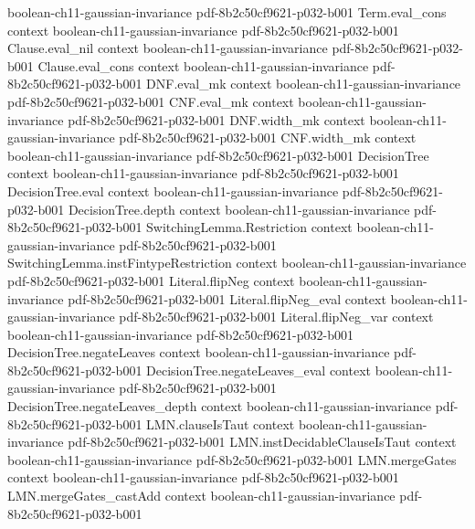 \begin{theorem}
  {boolean-ch11-gaussian-invariance}
  {pdf-8b2c50cf9621-p032-b001}
\proofstep
  {Term.eval_cons}
  {context}
  {boolean-ch11-gaussian-invariance}
  {pdf-8b2c50cf9621-p032-b001}
\proofstep
  {Clause.eval_nil}
  {context}
  {boolean-ch11-gaussian-invariance}
  {pdf-8b2c50cf9621-p032-b001}
\proofstep
  {Clause.eval_cons}
  {context}
  {boolean-ch11-gaussian-invariance}
  {pdf-8b2c50cf9621-p032-b001}
\proofstep
  {DNF.eval_mk}
  {context}
  {boolean-ch11-gaussian-invariance}
  {pdf-8b2c50cf9621-p032-b001}
\proofstep
  {CNF.eval_mk}
  {context}
  {boolean-ch11-gaussian-invariance}
  {pdf-8b2c50cf9621-p032-b001}
\proofstep
  {DNF.width_mk}
  {context}
  {boolean-ch11-gaussian-invariance}
  {pdf-8b2c50cf9621-p032-b001}
\proofstep
  {CNF.width_mk}
  {context}
  {boolean-ch11-gaussian-invariance}
  {pdf-8b2c50cf9621-p032-b001}
\proofstep
  {DecisionTree}
  {context}
  {boolean-ch11-gaussian-invariance}
  {pdf-8b2c50cf9621-p032-b001}
\proofstep
  {DecisionTree.eval}
  {context}
  {boolean-ch11-gaussian-invariance}
  {pdf-8b2c50cf9621-p032-b001}
\proofstep
  {DecisionTree.depth}
  {context}
  {boolean-ch11-gaussian-invariance}
  {pdf-8b2c50cf9621-p032-b001}
\proofstep
  {SwitchingLemma.Restriction}
  {context}
  {boolean-ch11-gaussian-invariance}
  {pdf-8b2c50cf9621-p032-b001}
\proofstep
  {SwitchingLemma.instFintypeRestriction}
  {context}
  {boolean-ch11-gaussian-invariance}
  {pdf-8b2c50cf9621-p032-b001}
\proofstep
  {Literal.flipNeg}
  {context}
  {boolean-ch11-gaussian-invariance}
  {pdf-8b2c50cf9621-p032-b001}
\proofstep
  {Literal.flipNeg_eval}
  {context}
  {boolean-ch11-gaussian-invariance}
  {pdf-8b2c50cf9621-p032-b001}
\proofstep
  {Literal.flipNeg_var}
  {context}
  {boolean-ch11-gaussian-invariance}
  {pdf-8b2c50cf9621-p032-b001}
\proofstep
  {DecisionTree.negateLeaves}
  {context}
  {boolean-ch11-gaussian-invariance}
  {pdf-8b2c50cf9621-p032-b001}
\proofstep
  {DecisionTree.negateLeaves_eval}
  {context}
  {boolean-ch11-gaussian-invariance}
  {pdf-8b2c50cf9621-p032-b001}
\proofstep
  {DecisionTree.negateLeaves_depth}
  {context}
  {boolean-ch11-gaussian-invariance}
  {pdf-8b2c50cf9621-p032-b001}
\proofstep
  {LMN.clauseIsTaut}
  {context}
  {boolean-ch11-gaussian-invariance}
  {pdf-8b2c50cf9621-p032-b001}
\proofstep
  {LMN.instDecidableClauseIsTaut}
  {context}
  {boolean-ch11-gaussian-invariance}
  {pdf-8b2c50cf9621-p032-b001}
\proofstep
  {LMN.mergeGates}
  {context}
  {boolean-ch11-gaussian-invariance}
  {pdf-8b2c50cf9621-p032-b001}
\proofstep
  {LMN.mergeGates_castAdd}
  {context}
  {boolean-ch11-gaussian-invariance}
  {pdf-8b2c50cf9621-p032-b001}

\end{theorem}

